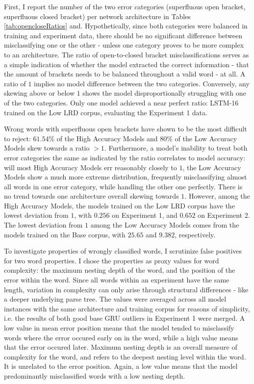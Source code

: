 

First, I report the number of the two error categories (superfluous open bracket, superfluous closed bracket) per network architecture in Tables \ref{tab:opencloseRatios} and. Hypothetically, since both categories were balanced in training and experiment data, there should be no significant difference between misclassifying one or the other - unless one category proves to be more complex to an architecture. The ratio of open-to-closed bracket misclassifications serves as a simple indication of whether the model extracted the correct information - that the amount of brackets needs to be balanced throughout a valid word - at all. A ratio of $1$ implies no model difference between the two categories. Conversely, any skewing above or below $1$ shows the model disproportionally struggling with one of the two categories. Only one model achieved a near perfect ratio: LSTM-16 trained on the Low LRD corpus, evaluating the Experiment 1 data.

Wrong words with superfluous open brackets have shown to be the most difficult to reject: $61.54\%$ of the High Accuracy Models and $80\%$ of the Low Accuracy Models skew towards a ratio $> 1$. Furthermore, a model's inability to treat both error categories the same as indicated by the ratio correlates to model accuracy: will most High Accuracy Models err reasonably closely to $1$, the Low Accuracy Models show a much more extreme distribution, frequently misclassifying almost all words in one error category, while handling the other one perfectly. There is no trend towards one architecture overall skewing towards $1$. However, among the High Accuracy Models, the models trained on the Low LRD corpus have the lowest deviation from $1$, with $0.256$ on Experiment 1, and $0.652$ on Experiment 2. The lowest deviation from $1$ among the Low Accuracy Models comes from the models trained on the Base corpus, with $25.65$ and $9.382$, respectively.

To investigate properties of wrongly classified words, I scrutinize false positives for two word properties. I chose the properties as proxy values for word complexity: the maximum nesting depth of the word, and the position of the error within the word. Since all words within an experiment have the same length, variation in complexity can only arise through structural differences - like a deeper underlying parse tree. The values were averaged across all model instances with the same architecture and training corpus for reasons of simplicity, i.e. the results of both good base GRU outliers in Experiment 1 were merged. A low value in mean error position means that the model tended to misclassify words where the error occured early on in the word, while a high value means that the error occured later. Maximum nesting depth is an overall measure of complexity for the word, and refers to the deepest nesting level within the word. It is unrelated to the error position. Again, a low value means that the model predominantly misclassified words with a low nesting depth.

